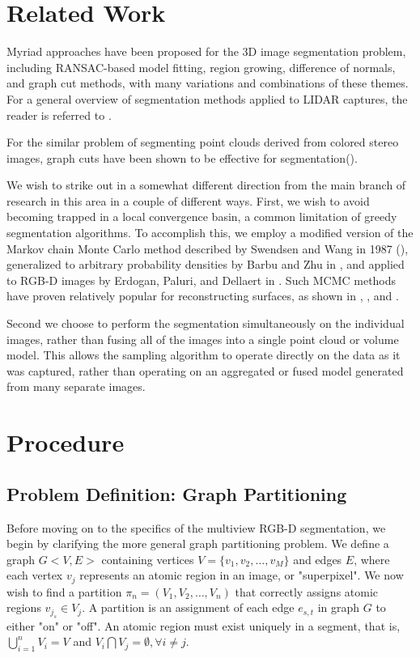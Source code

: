 \documentclass[10pt,letterpaper]{article}
\begin{document}
\section{Related Work}
	Myriad approaches have been proposed for the 3D image segmentation problem, including RANSAC-based model fitting, region growing, difference of normals, and graph cut methods, with many variations and combinations of these themes. For a general overview of segmentation methods applied to LIDAR captures, the reader is referred to \cite{douillard2011segmentation}. 
	
	For the similar problem of segmenting point clouds derived from colored stereo images, graph cuts have been shown to be effective for segmentation(\cite{bleyer2005graph}).

	
	We wish to strike out in a somewhat different direction from the main branch of research in this area in a couple of different ways. First, we wish to avoid becoming trapped in a local convergence basin, a common limitation of greedy segmentation algorithms. To accomplish this, we employ a modified version of the Markov chain Monte Carlo method described by Swendsen and Wang in 1987 (\cite{swendsen1987nonuniversal}), generalized to arbitrary probability densities by Barbu and Zhu in \cite{barbu2005generalizing}, and applied to RGB-D images by Erdogan, Paluri, and Dellaert in \cite{Erdogan12crv}. Such MCMC methods have proven relatively popular for reconstructing surfaces, as shown in \cite{tu2002image}, \cite{qiu2009jump}, and 	\cite{dick2002bayesian}.
	
	Second we choose to perform the segmentation simultaneously on the individual images, rather than fusing all of the images into a single point cloud or volume model. This allows the sampling algorithm to operate directly on the data as it was captured, rather than operating on an aggregated or fused model generated from many separate images.

\section{Procedure}

\subsection{Problem Definition: Graph Partitioning}

	Before moving on to the specifics of the multiview RGB-D segmentation, we begin by clarifying the more general graph partitioning problem. We define a graph $G<V,E>$ containing vertices $V=\{v_1,v_2,\ldots,v_M\}$ and edges $E$, where each vertex $v_j$ represents an atomic region in an image, or "superpixel". We now wish to find a partition $\pi_n=(V_1,V_2,\ldots,V_n)$ that correctly assigns atomic regions  $v_{j_s}\in{V_j}$. A partition is an assignment of each edge $e_{s,t}$ in graph $G$ to either "on" or "off". An atomic region must exist uniquely in a segment, that is, $\bigcup_{i=1}^{n}V_i=V$ and $V_i\bigcap{V_j}=\emptyset,\forall{i}\neq{j}$.
	
\end{document}
